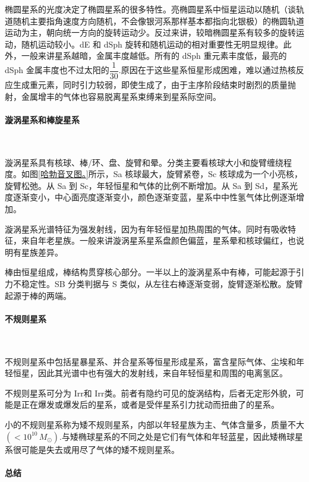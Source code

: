 \documentclass[../天体物理基础.tex]{subfiles}
\begin{document}
椭圆星系的光度决定了椭圆星系的很多特性。亮椭圆星系中恒星运动以随机（谈轨道随机主要指角速度方向随机，不会像银河系那样基本都指向北银极）的椭圆轨道运动为主，朝向统一方向的旋转运动少。反过来讲，较暗椭圆星系有较多的旋转运动，随机运动较小。dE 和 dSph 旋转和随机运动的相对重要性无明显规律。此外，一般来讲星系越暗，金属丰度越低。所有的 dSph 重元素丰度低，最亮的 dSph 金属丰度也不过太阳的$\dfrac{1}{30}$.原因在于这些星系恒星形成困难，难以通过热核反应生成重元素，同时引力较弱，即使生成了，由于主序阶段结束时剧烈的质量抛射，金属增丰的气体也容易脱离星系束缚来到星系际空间。

\paragraph{漩涡星系和棒旋星系}~{}

漩涡星系具有核球、棒/环、盘、旋臂和晕。分类主要看核球大小和旋臂缠绕程度。如图\ref{哈勃音叉图。}所示，Sa 核球最大，旋臂紧卷，Sc 核球成为一个小亮核，旋臂松弛。从 Sa 到 Sc，年轻恒星和气体的比例不断增加。从 Sa 到 Sd，星系光度逐渐变小，中心面亮度逐渐变小，颜色逐渐变蓝，星系中中性氢气体比例逐渐增加。

漩涡星系光谱特征为强发射线，因为有年轻恒星加热周围的气体。同时有吸收特征，来自年老星族。一般来讲漩涡星系星系盘颜色偏蓝，星系晕和核球偏红，也说明有星族差异。

棒由恒星组成，棒结构贯穿核心部分。一半以上的漩涡星系中有棒，可能起源于引力不稳定性。SB 分类判据与 S 类似，从左往右棒逐渐变弱，旋臂逐渐松散。旋臂起源于棒的两端。

\paragraph{不规则星系}~{}

不规则星系中包括星暴星系、并合星系等恒星形成星系，富含星际气体、尘埃和年轻恒星，因此其光谱中也有强大的发射线，来自年轻恒星和周围的电离氢区。

不规则星系可分为 Irr\uppercase\expandafter{}和 Irr\uppercase\expandafter{}类。前者有隐约可见的旋涡结构，后者无定形外貌，可能是正在爆发或爆发后的星系，或者是受伴星系引力扰动而扭曲了的星系。

小的不规则星系称为矮不规则星系，内部以年轻星族为主、气体含量多，质量不大$(<10^{10}\,\unit{M_{\odot}})$.与矮椭球星系的不同之处是它们有气体和年轻蓝星，因此矮椭球星系很可能是失去或用尽了气体的矮不规则星系。

\paragraph{总结}~{}
\end{document}
